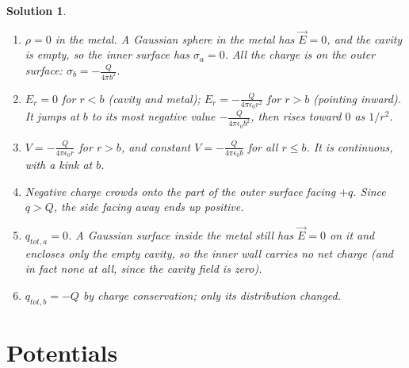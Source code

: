 \documentclass{article}
\newtheorem{solution}{Solution}
\begin{document}
\begin{solution}
    \begin{enumerate}[label=(\alph*)]
        \item $\rho = 0$ in the metal. A Gaussian sphere in the metal has $\vec{E} = 0$, and the cavity is empty, so the inner surface has $\sigma_a = 0$. All the charge is on the outer surface: $\sigma_b = -\frac{Q}{4\pi b^2}$.
        \item $E_r = 0$ for $r < b$ (cavity and metal); $E_r = -\frac{Q}{4\pi\epsilon_0 r^2}$ for $r > b$ (pointing inward). It jumps at $b$ to its most negative value $-\frac{Q}{4\pi\epsilon_0 b^2}$, then rises toward $0$ as $1/r^2$.
        \item $V = -\frac{Q}{4\pi\epsilon_0 r}$ for $r > b$, and constant $V = -\frac{Q}{4\pi\epsilon_0 b}$ for all $r \leq b$. It is continuous, with a kink at $b$.
        \item Negative charge crowds onto the part of the outer surface facing $+q$. Since $q > Q$, the side facing away ends up positive.
        \item $q_{tot,a} = 0$. A Gaussian surface inside the metal still has $\vec{E} = 0$ on it and encloses only the empty cavity, so the inner wall carries no net charge (and in fact none at all, since the cavity field is zero).
        \item $q_{tot,b} = -Q$ by charge conservation; only its distribution changed.
    \end{enumerate}
\end{solution}


\section{Potentials}
\end{document}
